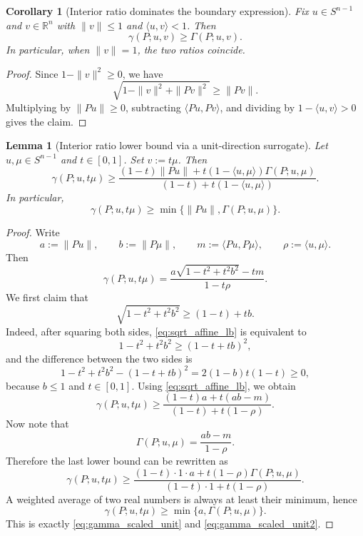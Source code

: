 \documentclass{article}
\newtheorem{lemma}{Lemma}
\newtheorem{corollary}{Corollary}
\begin{document}
\begin{corollary}[Interior ratio dominates the boundary expression]
\label{cor:gammaIntGeGamma}
Fix $u\in S^{n-1}$ and $v\in\mathbb R^n$ with $\|v\|\le 1$ and $\langle u,v\rangle<1$. Then
\begin{equation}
\gamma(P;u,v)\ge \Gamma(P;u,v).
\label{eq:gammaIntGeGamma}
\end{equation}
In particular, when $\|v\|=1$, the two ratios coincide.
\end{corollary}

\begin{proof}
Since $1-\|v\|^2\ge 0$, we have
\[
\sqrt{1-\|v\|^2+\|Pv\|^2}\ge \|Pv\|.
\]
Multiplying by $\|P u\|\ge 0$, subtracting $\langle P u,P v\rangle$, and dividing by $1-\langle u,v\rangle>0$ gives the claim.
\end{proof}

\begin{lemma}[Interior ratio lower bound via a unit-direction surrogate]
\label{lem:gamma_scaled_unit}
Let \(u,\mu\in S^{n-1}\) and \(t\in[0,1]\). Set \(v:=t\mu\). Then
\begin{equation}\label{eq:gamma_scaled_unit}
\gamma(P;u,t\mu)
\ge
\frac{(1-t)\|Pu\|+t(1-\langle u,\mu\rangle)\Gamma(P;u,\mu)}
{(1-t)+t(1-\langle u,\mu\rangle)}.
\end{equation}
In particular,
\begin{equation}\label{eq:gamma_scaled_unit2}
\gamma(P;u,t\mu)\ge \min\{\|Pu\|,\Gamma(P;u,\mu)\}.
\end{equation}
\end{lemma}

\begin{proof}
Write
\[
a:=\|P u\|,
\qquad
b:=\|P \mu\|,
\qquad
m:=\langle P u,P \mu\rangle,
\qquad
\rho:=\langle u,\mu\rangle.
\]
Then
\[
\gamma(P;u,t\mu)
=
\frac{a\sqrt{1-t^2+t^2b^2}-tm}{1-t\rho}.
\]
We first claim that
\begin{equation}
\sqrt{1-t^2+t^2b^2}\ge (1-t)+tb.
\label{eq:sqrt_affine_lb}
\end{equation}
Indeed, after squaring both sides, \eqref{eq:sqrt_affine_lb} is equivalent to
\[
1-t^2+t^2b^2\ge (1-t+tb)^2,
\]
and the difference between the two sides is
\[
1-t^2+t^2b^2-(1-t+tb)^2
=2(1-b)t(1-t)\ge 0,
\]
because $b\le 1$ and $t\in[0,1]$.
Using \eqref{eq:sqrt_affine_lb}, we obtain
\[
\gamma(P;u,t\mu)
\ge
\frac{(1-t)a+t(ab-m)}{(1-t)+t(1-\rho)}.
\]
Now note that
\[
\Gamma(P;u,\mu)=\frac{ab-m}{1-\rho}.
\]
Therefore the last lower bound can be rewritten as
\[
\gamma(P;u,t\mu)
\ge
\frac{(1-t)\cdot 1\cdot a+t(1-\rho)\Gamma(P;u,\mu)}{(1-t)\cdot 1+t(1-\rho)}.
\]
A weighted average of two real numbers is always at least their minimum, hence
\[
\gamma(P;u,t\mu)\ge \min\{a,\Gamma(P;u,\mu)\}.
\]
This is exactly \eqref{eq:gamma_scaled_unit} and \eqref{eq:gamma_scaled_unit2}.
\end{proof}
\end{document}
